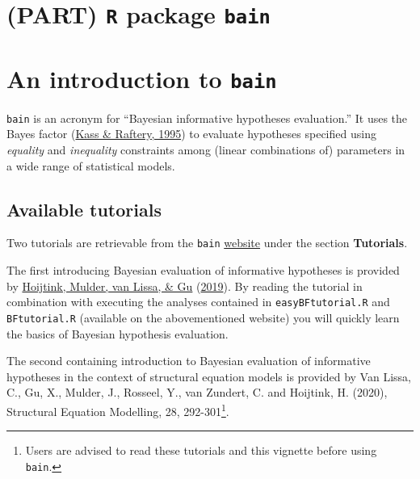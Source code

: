 \documentclass[
]{book}
\begin{document}
\hypertarget{part-r-package-bain}{%
\chapter*{\texorpdfstring{(PART) \texttt{R} package \texttt{bain}}{(PART) R package bain}}\label{part-r-package-bain}}

\hypertarget{an-introduction-to-bain}{%
\chapter*{\texorpdfstring{An introduction to \texttt{bain}}{An introduction to bain}}\label{an-introduction-to-bain}}

\texttt{bain} is an acronym for ``Bayesian informative hypotheses evaluation.''
It uses the Bayes factor (\protect\hyperlink{ref-kass1995bayes}{Kass \& Raftery, 1995}) to evaluate hypotheses specified using \emph{equality} and \emph{inequality} constraints among (linear combinations of) parameters in a wide range of statistical models.

\hypertarget{available-tutorials}{%
\section{Available tutorials}\label{available-tutorials}}

Two tutorials are retrievable from the \texttt{bain} \href{https://informative-hypotheses.sites.uu.nl/software/bain/}{website} under the section \textbf{Tutorials}.

The first introducing Bayesian evaluation of informative hypotheses is provided by \protect\hyperlink{ref-e575e990fdef4c469a1c19a210d58e2f}{Hoijtink, Mulder, van Lissa, \& Gu} (\protect\hyperlink{ref-e575e990fdef4c469a1c19a210d58e2f}{2019}). By reading the tutorial in combination with executing the analyses contained in \texttt{easyBFtutorial.R} and \texttt{BFtutorial.R} (available on the abovementioned website) you will quickly learn the basics of Bayesian hypothesis evaluation.

The second containing introduction to Bayesian evaluation of informative hypotheses in the context of structural equation models is provided by Van Lissa, C., Gu, X., Mulder, J., Rosseel, Y., van Zundert, C. and Hoijtink, H. (2020), Structural Equation Modelling, 28, 292-301\footnote{Users are
  advised to read these tutorials and this vignette before using \texttt{bain}.}.
\end{document}
